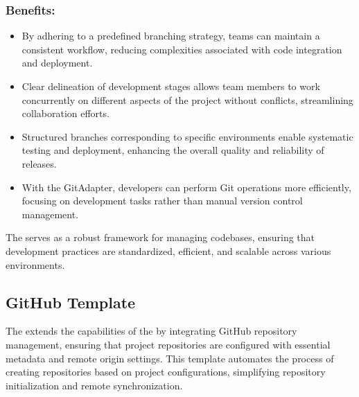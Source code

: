 \documentclass[letterpaper,10pt,english]{sphinxhowto}
\begin{document}
\subsubsection{Benefits:}
\label{\detokenize{templates/git/index:benefits}}\begin{itemize}
\item {} 
\sphinxAtStartPar
{} By adhering to a predefined branching strategy, teams can maintain a consistent workflow, reducing complexities associated with code integration and deployment.

\item {} 
\sphinxAtStartPar
{} Clear delineation of development stages allows team members to work concurrently on different aspects of the project without conflicts, streamlining collaboration efforts.

\item {} 
\sphinxAtStartPar
{} Structured branches corresponding to specific environments enable systematic testing and deployment, enhancing the overall quality and reliability of releases.

\item {} 
\sphinxAtStartPar
{} With the GitAdapter, developers can perform Git operations more efficiently, focusing on development tasks rather than manual version control management.

\end{itemize}

\sphinxAtStartPar
The  serves as a robust framework for managing codebases, ensuring that development practices are standardized, efficient, and scalable across various environments.

\sphinxstepscope


\subsection{GitHub Template}
\label{\detokenize{templates/github/index:github-template}}\label{\detokenize{templates/github/index::doc}}
\sphinxAtStartPar
The  extends the capabilities of the  by integrating GitHub repository management, ensuring that project repositories are configured with essential metadata and remote origin settings. This template automates the process of creating repositories based on project configurations, simplifying repository initialization and remote synchronization.
\end{document}
